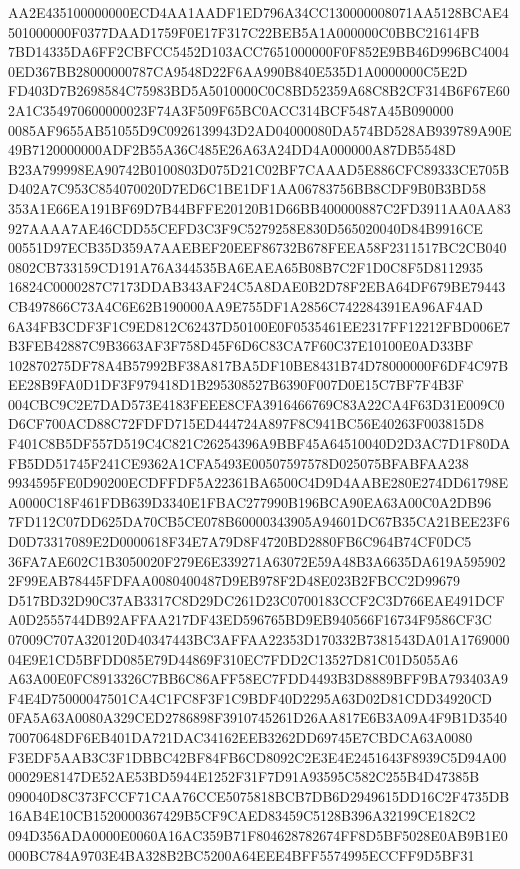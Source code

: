 \documentclass[UTF8,fontset=fandol,zihao=-4,a4paper]{ctexart}
\begin{document}
{{AA2E435100000000ECD4AA1AADF1ED796A34CC130000008071AA5128BCAE4501000000F0377DAAD1759F0E17F317C22BEB5A1A000000C0BBC21614FB
7BD14335DA6FF2CBFCC5452D103ACC7651000000F0F852E9BB46D996BC40040ED367BB28000000787CA9548D22F6AA990B840E535D1A0000000C5E2D
FD403D7B2698584C75983BD5A5010000C0C8BD52359A68C8B2CF314B6F67E602A1C354970600000023F74A3F509F65BC0ACC314BCF5487A45B090000
0085AF9655AB51055D9C0926139943D2AD04000080DA574BD528AB939789A90E49B7120000000ADF2B55A36C485E26A63A24DD4A000000A87DB5548D
B23A799998EA90742B0100803D075D21C02BF7CAAAD5E886CFC89333CE705BD402A7C953C854070020D7ED6C1BE1DF1AA06783756BB8CDF9B0B3BD58
353A1E66EA191BF69D7B44BFFE20120B1D66BB400000887C2FD3911AA0AA83927AAAA7AE46CDD55CEFD3C3F9C5279258E830D565020040D84B9916CE
00551D97ECB35D359A7AAEBEF20EEF86732B678FEEA58F2311517BC2CB0400802CB733159CD191A76A344535BA6EAEA65B08B7C2F1D0C8F5D8112935
16824C0000287C7173DDAB343AF24C5A8DAE0B2D78F2EBA64DF679BE79443CB497866C73A4C6E62B190000AA9E755DF1A2856C742284391EA96AF4AD
6A34FB3CDF3F1C9ED812C62437D50100E0F0535461EE2317FF12212FBD006E7B3FEB42887C9B3663AF3F758D45F6D6C83CA7F60C37E10100E0AD33BF
102870275DF78A4B57992BF38A817BA5DF10BE8431B74D78000000F6DF4C97BEE28B9FA0D1DF3F979418D1B295308527B6390F007D0E15C7BF7F4B3F
004CBC9C2E7DAD573E4183FEEE8CFA3916466769C83A22CA4F63D31E009C0D6CF700ACD88C72FDFD715ED444724A897F8C941BC56E40263F003815D8
F401C8B5DF557D519C4C821C26254396A9BBF45A64510040D2D3AC7D1F80DAFB5DD51745F241CE9362A1CFA5493E00507597578D025075BFABFAA238
9934595FE0D90200ECDFFDF5A22361BA6500C4D9D4AABE280E274DD61798EA0000C18F461FDB639D3340E1FBAC277990B196BCA90EA63A00C0A2DB96
7FD112C07DD625DA70CB5CE078B60000343905A94601DC67B35CA21BEE23F6D0D73317089E2D0000618F34E7A79D8F4720BD2880FB6C964B74CF0DC5
36FA7AE602C1B3050020F279E6E339271A63072E59A48B3A6635DA619A5959022F99EAB78445FDFAA0080400487D9EB978F2D48E023B2FBCC2D99679
D517BD32D90C37AB3317C8D29DC261D23C0700183CCF2C3D766EAE491DCFA0D2555744DB92AFFAA217DF43ED596765BD9EB940566F16734F9586CF3C
07009C707A320120D40347443BC3AFFAA22353D170332B7381543DA01A176900004E9E1CD5BFDD085E79D44869F310EC7FDD2C13527D81C01D5055A6
A63A00E0FC8913326C7BB6C86AFF58EC7FDD4493B3D8889BFF9BA793403A9F4E4D75000047501CA4C1FC8F3F1C9BDF40D2295A63D02D81CDD34920CD
0FA5A63A0080A329CED2786898F3910745261D26AA817E6B3A09A4F9B1D354070070648DF6EB401DA721DAC34162EEB3262DD69745E7CBDCA63A0080
F3EDF5AAB3C3F1DBBC42BF84FB6CD8092C2E3E4E2451643F8939C5D94A0000029E8147DE52AE53BD5944E1252F31F7D91A93595C582C255B4D47385B
090040D8C373FCCF71CAA76CCE5075818BCB7DB6D2949615DD16C2F4735DB16AB4E10CB1520000367429B5CF9CAED83459C5128B396A32199CE182C2
094D356ADA0000E0060A16AC359B71F804628782674FF8D5BF5028E0AB9B1E0000BC784A9703E4BA328B2BC5200A64EEE4BFF5574995ECCFF9D5BF31
}}
\end{document}

